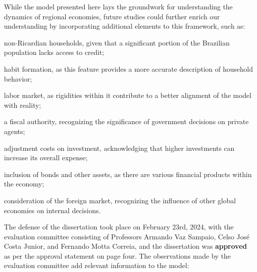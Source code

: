 \documentclass[../thesis.tex]{subfiles}
\begin{document}
While the model presented here lays the groundwork for understanding the dynamics of regional economies, future studies could further enrich our understanding by incorporating additional elements to this framework, such as: %
\begin{enumerate*}[label=(\arabic*)]
	\item non-Ricardian households, given that a significant portion of the Brazilian population lacks access to credit; 
	\item habit formation, as this feature provides a more accurate description of household behavior;
	\item labor market, as rigidities within it contribute to a better alignment of the model with reality;
	\item a fiscal authority, recognizing the significance of government decisions on private agents;
	\item adjustment costs on investment, acknowledging that higher investments can increase its overall expense;
	\item inclusion of bonds and other assets, as there are various financial products within the economy;
	\item consideration of the foreign market, recognizing the influence of other global economies on internal decisions.
\end{enumerate*} 


The defense of the dissertation took place on February 23rd, 2024, with the evaluation committee consisting of Professors Armando Vaz Sampaio, Celso José Costa Junior, and Fernando Motta Correia, and the dissertation was \textbf{approved} as per the approval statement on page four. The observations made by the evaluation committee add relevant information to the model:
\end{document}
